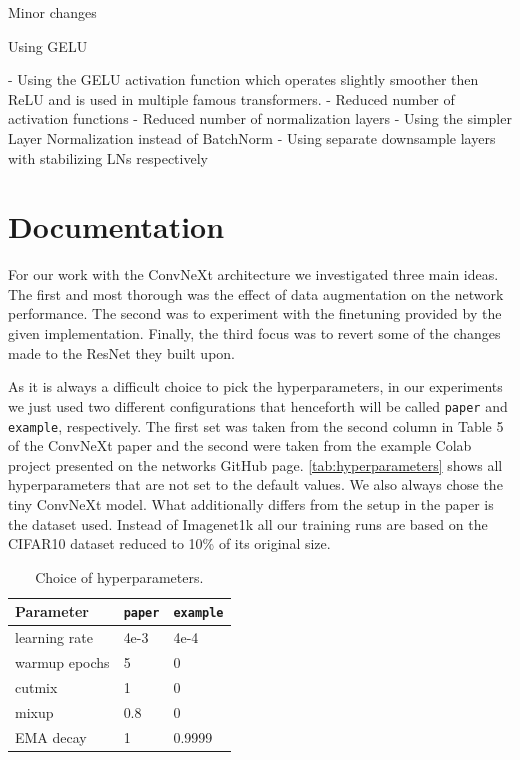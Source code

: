 \documentclass{article}
\begin{document}
Minor changes

Using GELU

- Using the GELU activation function which operates slightly smoother then ReLU and is used in multiple famous transformers.
- Reduced number of activation functions
- Reduced number of normalization layers
- Using the simpler Layer Normalization instead of BatchNorm
- Using separate downsample layers with stabilizing LNs respectively


\section{Documentation}\label{sec:documentation}
For our work with the ConvNeXt architecture we investigated three main ideas.
The first and most thorough was the effect of data augmentation on the network performance.
The second was to experiment with the finetuning provided by the given implementation.
Finally, the third focus was to revert some of the changes~ made to the ResNet they built upon.

As it is always a difficult choice to pick the hyperparameters, in our experiments we just used two different configurations that henceforth will be called \texttt{paper} and \texttt{example}, respectively.
The first set was taken from the second column in Table 5 of the ConvNeXt\cite{liu2022convnet} paper and the second were taken from the example Colab project presented on the networks GitHub page\cite{ayush0finetune}.
\autoref{tab:hyperparameters} shows all hyperparameters that are not set to the default values.
We also always chose the tiny ConvNeXt model.
What additionally differs from the setup in the paper is the dataset used.
Instead of Imagenet1k all our training runs are based on the CIFAR10\cite{krizhevsky2009learning} dataset reduced to 10\% of its original size.
\begin{table}[h]
    \caption{Choice of hyperparameters.}
    \begin{center}
        \begin{tabular}{lll}
            \hline
            Parameter     & \texttt{paper} & \texttt{example} \\ \hline
            learning rate & 4e-3           & 4e-4             \\
            warmup epochs & 5              & 0                \\
            cutmix        & 1              & 0                \\
            mixup         & 0.8            & 0                \\
            EMA decay     & 1              & 0.9999
        \end{tabular}
    \end{center}
    \label{tab:hyperparameters}
\end{table}
\end{document}
